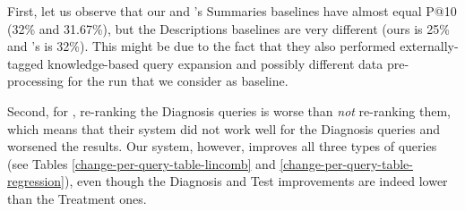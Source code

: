\begin{table}
\centering
\caption{Comparison with previous research --- absolute P@10 percent improvements for Summaries 2014 and Descriptions 2014.}
\label{choi-comp}
\end{table}

First, let us observe that our and \cite{choi}'s Summaries baselines have almost equal P@10 (32\% and 31.67\%),
but the Descriptions baselines are very different (ours is 25\% and \cite{choi}'s is 32\%).
This might be due to the fact that they also performed externally-tagged knowledge-based query expansion
and possibly different data pre-processing for the
run that we consider as baseline.

Second, for \cite{choi}, re-ranking the Diagnosis queries is worse than \emph{not} re-ranking them, which means that
their system did not work well for the Diagnosis queries and worsened the results.
Our system, however, improves all three types of queries
(see Tables \ref{change-per-query-table-lincomb} and \ref{change-per-query-table-regression}),
even though the Diagnosis and Test improvements are indeed lower than the Treatment ones.

